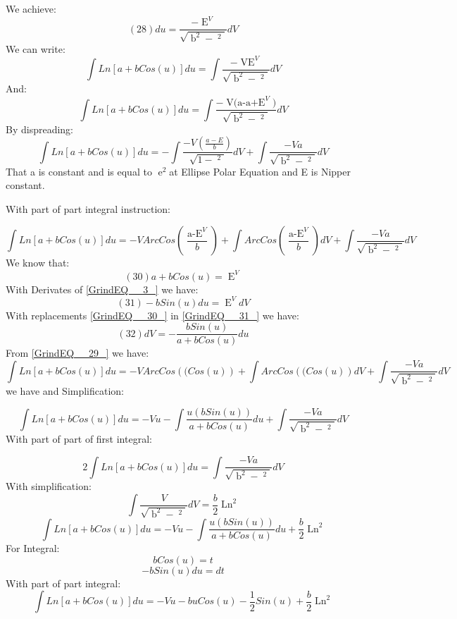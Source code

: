\documentclass{article}
\begin{document}
\noindent We achieve:
\[                          (28)         du=\frac{-\mathop{E}\nolimits^{V} }{\sqrt{\mathop{b}\nolimits^{2} -\mathop{(a-\mathop{E}\nolimits^{V} )}\nolimits^{2} } } dV\] 
We can write:
\[\int Ln\left[a+bCos(u)\right] du=\int \frac{-\mathop{VE}\nolimits^{V} }{\sqrt{\mathop{b}\nolimits^{2} -\mathop{\left(a-\mathop{E}\nolimits^{V} \right)}\nolimits^{2} } }  dV\] 
And:
\[\int Ln\left[a+bCos(u)\right] du=\int \frac{-\mathop{V(a-a+E}\nolimits^{V} )}{\sqrt{\mathop{b}\nolimits^{2} -\mathop{\left(a-\mathop{E}\nolimits^{V} \right)}\nolimits^{2} } }  dV\] 
By dispreading:
\[\int Ln\left[a+bCos(u)\right] du=-\int \frac{-V\left(\frac{a-E}{b} \right)}{\sqrt{1-\mathop{\left(\frac{a-E}{b} \right)}\nolimits^{2} } }  dV+\int \frac{-Va}{\sqrt{\mathop{b}\nolimits^{2} -\mathop{\left(a-\mathop{E}\nolimits^{V} \right)}\nolimits^{2} } }  dV\] 
That a is constant and is equal to $\mathop{e}\nolimits^{2} $at Ellipse Polar Equation and E is Nipper constant.

\noindent With part of part integral instruction:

\noindent 
\begin{equation} \label{GrindEQ__29_} 
\int Ln\left[a+bCos(u)\right] du=-VArcCos\left(\frac{\mathop{a-E}\nolimits^{V} }{b} \right)+\int ArcCos\left(\frac{\mathop{a-E}\nolimits^{V} }{b} \right) dV+\int \frac{-Va}{\sqrt{\mathop{b}\nolimits^{2} -\mathop{\left(a-\mathop{E}\nolimits^{V} \right)}\nolimits^{2} } }  dV 
\end{equation} 
We know that:
\[                           (30)                  a+bCos(u)=\mathop{E}\nolimits^{V} \] 
With Derivates of \eqref{GrindEQ__3_} we have:
\[                           (31)             -bSin(u)du=\mathop{E}\nolimits^{V} dV\] 
With replacements \eqref{GrindEQ__30_} in \eqref{GrindEQ__31_} we have:
\[                           (32)             dV=-\frac{bSin(u)}{a+bCos(u)} du\] 
From \eqref{GrindEQ__29_} we have:
\[\int Ln\left[a+bCos(u)\right] du=-VArcCos\left((Cos(u)\right)+\int ArcCos\left((Cos(u)\right)dV+ \int \frac{-Va}{\sqrt{\mathop{b}\nolimits^{2} -\mathop{\left(a-\mathop{E}\nolimits^{V} \right)}\nolimits^{2} } }  dV\] 
we have and Simplification: 

\noindent 
\[\int Ln\left[a+bCos(u)\right] du=-Vu-\int \frac{u(bSin(u))}{a+bCos(u)} du +\int \frac{-Va}{\sqrt{\mathop{b}\nolimits^{2} -\mathop{\left(a-\mathop{E}\nolimits^{V} \right)}\nolimits^{2} } }  dV\] 
With part of part of first integral:

\noindent 
\[2\int Ln\left[a+bCos(u)\right] du=\int \frac{-Va}{\sqrt{\mathop{b}\nolimits^{2} -\mathop{\left(a-\mathop{E}\nolimits^{V} \right)}\nolimits^{2} } }  dV\] 
With simplification:
\[\int \frac{V}{\sqrt{\mathop{b}\nolimits^{2} -\mathop{\left(a-\mathop{E}\nolimits^{V} \right)}\nolimits^{2} } }  dV=\frac{b}{2} \mathop{Ln[a+bCos(u)]}\nolimits^{2} \] 
\[\int Ln\left[a+bCos(u)\right] du=-Vu-\int \frac{u(bSin(u))}{a+bCos(u)} du +\frac{b}{2} \mathop{Ln[a+bCos(u)]}\nolimits^{2} \] 
For Integral:
\[bCos(u)=t\] 
\[-bSin(u)du=dt\] 
With part of part integral:
\[\int Ln\left[a+bCos(u)\right] du=-Vu-buCos(u)-\frac{1}{2} Sin(u)+\frac{b}{2} \mathop{Ln[a+bCos(u)]}\nolimits^{2} \] 
\end{document}
